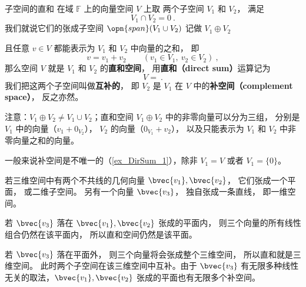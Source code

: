 
\begin{issues}
\issueTODO
{}
\end{issues}



\begin{definition}{子空间的直和}\label{def_DirSum_1}
在域 $\mathbb F$ 上的向量空间 $V$ 上取 两个子空间 $V_1$ 和 $V_2$， 满足
\begin{equation}
V_1 \cap V_2 = \qty{0}~.
\end{equation}
我们就说它们的张成子空间 $\opn{span} (V_1 \cup V_2)$ 记做 $V_1 \oplus V_2$

且任意 ${v} \in V$ 都能表示为 $V_1$ 和 $V_2$ 中向量的之和， 即
\begin{equation}\label{eq_DirSum_2}
v = v_1 + v_2
\qquad
(v_1 \in V_1,\ v_2 \in V_2)~,
\end{equation}
那么空间 $V$ 就是 $V_1$ 和 $V_2$ 的\textbf{直和空间}， 用\textbf{直和（direct sum）}运算记为
\begin{equation}
V = ~.
\end{equation}
我们把这两个子空间叫做\textbf{互补的}， 即 $V_2$ 是 $V_1$ 在 $V$ 中的\textbf{补空间（complement space）}， 反之亦然。
\end{definition}


注意：$V_1 \oplus V_2 \neq V_1 \cup V_2$；直和空间 $V_1 \oplus V_2$ 中的非零向量可以分为三组， 分别是 $V_1$ 中的向量（$v_1 + 0_{V_2}$）， $V_2$ 的向量（$0_{V_1} + v_2$）， 以及只能表示为 $V_1$ 和 $V_2$ 中非零向量之和的向量。

一般来说补空间是不唯一的（\autoref{ex_DirSum_1}），除非 $V_1 = V$ 或者 $V_1 = \{0\}$。

\begin{example}{}\label{ex_DirSum_1}
若三维空间中有两个不共线的几何向量 $\bvec{v_1}, \bvec{v_2}$， 它们张成一个平面， 或二维子空间。 另有一个向量 $\bvec{v_3}$， 独自张成一条直线， 即一维空间。

若 $\bvec{v_3}$ 落在 $\bvec{v_1}, \bvec{v_2}$ 张成的平面内， 则三个向量的所有线性组合仍然在该平面内， 所以直和空间仍然是该平面。

若 $\bvec{v_3}$ 落在平面外， 则三个向量将会张成整个三维空间， 所以直和就是三维空间。 此时两个子空间在该三维空间中互补。由于 $\bvec{v_3}$ 有无限多种线性无关的取法，$\bvec{v_1}, \bvec{v_2}$ 张成的平面也有无限多个补空间。
\end{example}

